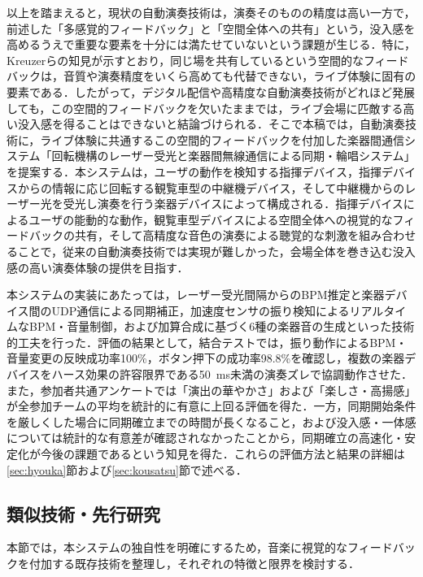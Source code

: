以上を踏まえると，現状の自動演奏技術は，演奏そのものの精度は高い一方で，前述した「多感覚的フィードバック」と「空間全体への共有」という，没入感を高めるうえで重要な要素を十分には満たせていないという課題が生じる．特に，Kreuzerらの知見が示すとおり，同じ場を共有しているという空間的なフィードバックは，音質や演奏精度をいくら高めても代替できない，ライブ体験に固有の要素である．したがって，デジタル配信や高精度な自動演奏技術がどれほど発展しても，この空間的フィードバックを欠いたままでは，ライブ会場に匹敵する高い没入感を得ることはできないと結論づけられる．そこで本稿では，自動演奏技術に，ライブ体験に共通するこの空間的フィードバックを付加した楽器間通信システム「回転機構のレーザー受光と楽器間無線通信による同期・輪唱システム」を提案する．本システムは，ユーザの動作を検知する指揮デバイス，指揮デバイスからの情報に応じ回転する観覧車型の中継機デバイス，そして中継機からのレーザー光を受光し演奏を行う楽器デバイスによって構成される．指揮デバイスによるユーザの能動的な動作，観覧車型デバイスによる空間全体への視覚的なフィードバックの共有，そして高精度な音色の演奏による聴覚的な刺激を組み合わせることで，従来の自動演奏技術では実現が難しかった，会場全体を巻き込む没入感の高い演奏体験の提供を目指す．

本システムの実装にあたっては，レーザー受光間隔からのBPM推定と楽器デバイス間のUDP通信による同期補正，加速度センサの振り検知によるリアルタイムなBPM・音量制御，および加算合成に基づく6種の楽器音の生成といった技術的工夫を行った．評価の結果として，結合テストでは，振り動作によるBPM・音量変更の反映成功率100\%，ボタン押下の成功率98.8\%を確認し，複数の楽器デバイスをハース効果の許容限界である\SI{50}{ms}未満の演奏ズレで協調動作させた．また，参加者共通アンケートでは「演出の華やかさ」および「楽しさ・高揚感」が全参加チームの平均を統計的に有意に上回る評価を得た．一方，同期開始条件を厳しくした場合に同期確立までの時間が長くなること，および没入感・一体感については統計的な有意差が確認されなかったことから，同期確立の高速化・安定化が今後の課題であるという知見を得た．これらの評価方法と結果の詳細は\ref{sec:hyouka}節および\ref{sec:kousatsu}節で述べる．

\subsection{類似技術・先行研究}

本節では，本システムの独自性を明確にするため，音楽に視覚的なフィードバックを付加する既存技術を整理し，それぞれの特徴と限界を検討する．

